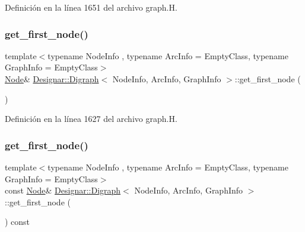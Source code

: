 Definición en la línea 1651 del archivo graph.\+H.

\mbox{\label{class_designar_1_1_digraph_a420caa785d93decc7b096de9e51644e7}} 
\subsubsection{\texorpdfstring{get\+\_\+first\+\_\+node()}{get\_first\_node()}\hspace{0.1cm}{\footnotesize\ttfamily [1/2]}}
{\footnotesize\ttfamily template$<$typename Node\+Info , typename Arc\+Info  = Empty\+Class, typename Graph\+Info  = Empty\+Class$>$ \\
\hyperlink{class_designar_1_1_digraph_a4dc921c41a480b7946a04170e997d8ae}{Node}\& \hyperlink{class_designar_1_1_digraph}{Designar\+::\+Digraph}$<$ Node\+Info, Arc\+Info, Graph\+Info $>$\+::get\+\_\+first\+\_\+node (\begin{DoxyParamCaption}{ }\end{DoxyParamCaption})\hspace{0.3cm}{\ttfamily [inline]}}



Definición en la línea 1627 del archivo graph.\+H.

\mbox{\label{class_designar_1_1_digraph_ada5266ac3e2ed091a37c434dd7484bb9}} 
\subsubsection{\texorpdfstring{get\+\_\+first\+\_\+node()}{get\_first\_node()}\hspace{0.1cm}{\footnotesize\ttfamily [2/2]}}
{\footnotesize\ttfamily template$<$typename Node\+Info , typename Arc\+Info  = Empty\+Class, typename Graph\+Info  = Empty\+Class$>$ \\
const \hyperlink{class_designar_1_1_digraph_a4dc921c41a480b7946a04170e997d8ae}{Node}\& \hyperlink{class_designar_1_1_digraph}{Designar\+::\+Digraph}$<$ Node\+Info, Arc\+Info, Graph\+Info $>$\+::get\+\_\+first\+\_\+node (\begin{DoxyParamCaption}{ }\end{DoxyParamCaption}) const\hspace{0.3cm}{\ttfamily [inline]}}



